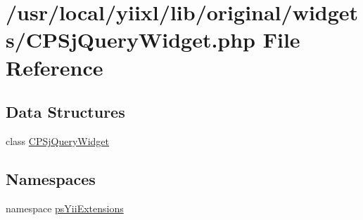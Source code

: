 \hypertarget{CPSjQueryWidget_8php}{
\section{/usr/local/yiixl/lib/original/widgets/CPSjQueryWidget.php File Reference}
\label{CPSjQueryWidget_8php}
}
\subsection*{Data Structures}
\begin{DoxyCompactItemize}
\item 
class \hyperlink{classCPSjQueryWidget}{CPSjQueryWidget}
\end{DoxyCompactItemize}
\subsection*{Namespaces}
\begin{DoxyCompactItemize}
\item 
namespace \hyperlink{namespacepsYiiExtensions}{psYiiExtensions}
\end{DoxyCompactItemize}
